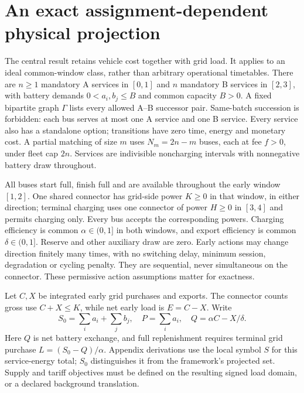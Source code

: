 \section{An exact assignment-dependent physical projection}
\label{sec:core}
The central result retains vehicle cost together with grid load. It applies
to an ideal common-window class, rather than arbitrary operational timetables.
There are $n\ge1$ mandatory A services in $[0,1]$ and $n$ mandatory B
services in $[2,3]$, with battery demands $0<a_i,b_j\le B$ and common
capacity $B>0$. A fixed bipartite graph $\Gamma$ lists every allowed
A--B successor pair. Same-batch succession is forbidden: each bus serves
at most one A service and one B service. Every service also has a standalone option; transitions
have zero time, energy and monetary cost. A partial matching of size $m$
uses $N_m=2n-m$ buses, each at fee $f>0$, under fleet cap $2n$.
Services are indivisible noncharging intervals with nonnegative battery draw
throughout.

All buses start full, finish full and are available throughout the early
window $[1,2]$. One shared connector has grid-side power $K\ge0$ in
that window, in either direction; terminal charging uses one connector of
power $H\ge0$ in $[3,4]$ and permits charging only. Every bus accepts the
corresponding powers.
Charging efficiency is common $\alpha\in(0,1]$ in both windows, and
export efficiency is common $\delta\in(0,1]$. Reserve and other auxiliary
draw are zero. Early actions may change direction finitely many times,
with no switching delay, minimum session, degradation or cycling penalty.
They are sequential, never simultaneous on the connector. These permissive
action assumptions matter for exactness.

Let $C,X$ be integrated early grid purchases and exports. The connector
counts gross use $C+X\le K$, while net early load is $E=C-X$.
Write
\[
 S_0=\sum_i a_i+\sum_j b_j,\quad P=\sum_i a_i,\quad
 Q=\alpha C-X/\delta.
\]
Here $Q$ is net battery exchange, and full replenishment requires terminal
grid purchase $L=(S_0-Q)/\alpha$. Appendix derivations use the local
symbol $S$ for this service-energy total; $S_0$ distinguishes it from the
framework's projected set. Supply and tariff objectives must be defined
on the resulting signed load domain, or a declared background translation.

